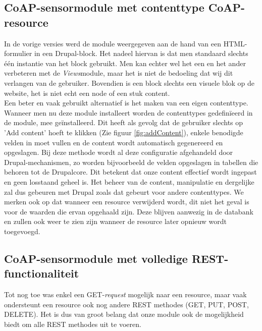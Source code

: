 \subsection{CoAP-sensormodule met contenttype CoAP-resource}
In de vorige versies werd de module weergegeven aan de hand van een HTML-formulier in een Drupal-block. Het nadeel hiervan is dat men standaard slechts \'{e}\'{e}n instantie van het block gebruikt. Men kan echter wel het een en het ander verbeteren met de \textit{Views}module, maar het is niet de bedoeling dat wij dit verlangen van de gebruiker. Bovendien is een block slechts een visuele blok op de website, het is niet echt een node of een stuk content.\\

Een beter en vaak gebruikt alternatief is het maken van een eigen contenttype. Wanneer men nu deze module installeert worden de contenttypes gedefin\"{i}eerd in de module, mee ge\"{i}nstalleerd. Dit heeft als gevolg dat de gebruiker slechts op 'Add content' hoeft te klikken (Zie figuur \ref{fig:addContent}), enkele benodigde velden in moet vullen en de content wordt automatisch gegenereerd en opgeslagen. Bij deze methode wordt al deze configuratie afgehandeld door Drupal-mechanismen, zo worden bijvoorbeeld de velden opgeslagen in tabellen die behoren tot de Drupalcore. Dit betekent dat onze content effectief wordt ingepast en geen losstaand geheel is. Het beheer van de content, manipulatie en dergelijke zal dus gebeuren met Drupal zoals dat gebeurt voor andere contenttypes. We merken ook op dat wanneer een resource verwijderd wordt, dit niet het geval is voor de waarden die ervan opgehaald zijn. Deze blijven aanwezig in de databank en zullen ook weer te zien zijn wanneer de resource later opnieuw wordt toegevoegd.\\

\subsection{CoAP-sensormodule met volledige REST-functionaliteit} \label{rest}
Tot nog toe was enkel een GET-\textit{request} mogelijk naar een resource, maar vaak ondersteunt een resource ook nog andere REST methodes (GET, PUT, POST, DELETE). Het is dus van groot belang dat onze module ook de mogelijkheid biedt om alle REST methodes uit te voeren.\\


